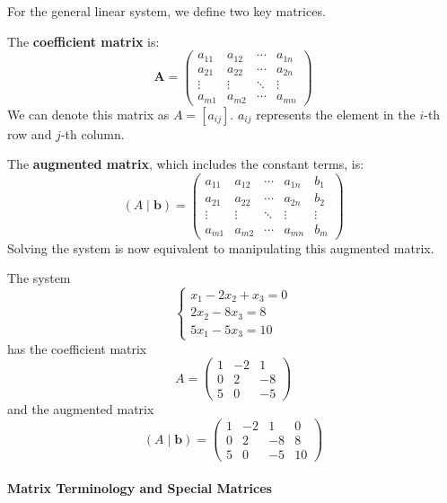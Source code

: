 \documentclass[oneside]{book}
\begin{document}
For the general linear system, we define two key matrices.

The \textbf{coefficient matrix} is:
\[ \textbf{A} = \begin{pmatrix}
a_{11} & a_{12} & \cdots & a_{1n} \\
a_{21} & a_{22} & \cdots & a_{2n} \\
\vdots & \vdots & \ddots & \vdots \\
a_{m1} & a_{m2} & \cdots & a_{mn}
\end{pmatrix} \]
We can denote this matrix as $A = [a_{ij}]$. $a_{ij}$ represents the element in the $i$-th row and $j$-th column.

The \textbf{augmented matrix}, which includes the constant terms, is:
\[ (A \mid \mathbf{b}) = \left(\begin{array}{cccc|c}
a_{11} & a_{12} & \cdots & a_{1n} & b_1 \\
a_{21} & a_{22} & \cdots & a_{2n} & b_2 \\
\vdots & \vdots & \ddots & \vdots & \vdots \\
a_{m1} & a_{m2} & \cdots & a_{mn} & b_m
\end{array}\right) \]
Solving the system is now equivalent to manipulating this augmented matrix.

\begin{example}
The system
\[
\begin{cases}
x_1 - 2x_2 + x_3 = 0 \\
2x_2 - 8x_3 = 8 \\
5x_1 - 5x_3 = 10
\end{cases}
\]
has the coefficient matrix
\[ A = \begin{pmatrix} 1 & -2 & 1 \\ 0 & 2 & -8 \\ 5 & 0 & -5 \end{pmatrix} \]
and the augmented matrix
\[ (A \mid \mathbf{b}) = \left(\begin{array}{ccc|c} 1 & -2 & 1 & 0 \\ 0 & 2 & -8 & 8 \\ 5 & 0 & -5 & 10 \end{array}\right) \]
\end{example}

\paragraph{Matrix Terminology and Special Matrices}
\end{document}

